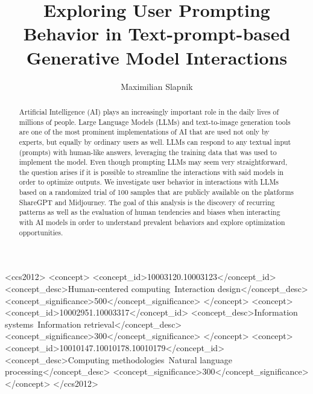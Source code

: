 \documentclass[sigconf]{acmart}
\begin{document}
\title[Prompting Behavior in Text-prompt-based Generative Model Interactions]{Exploring User
Prompting Behavior in Text-prompt-based Generative Model Interactions}

\author{Maximilian Slapnik}


\begin{abstract}
  \sloppy
  Artificial Intelligence (AI) plays an increasingly important role in the daily lives of
  millions of people.
  Large Language Models (LLMs) and text-to-image generation tools are one of the most prominent
  implementations of AI that are used
  not only by experts, but equally by ordinary users as well.
  LLMs can respond to any textual input (prompts) with human-like answers, leveraging the
  training data that was used to implement the model.
  Even though prompting LLMs may seem very straightforward, the question arises if it is possible
  to streamline the interactions with said models in order to optimize outputs.
  We investigate user behavior in interactions with LLMs based on a randomized trial of 100
  samples that are publicly available on the platforms ShareGPT and Midjourney.
  The goal of this analysis is the discovery of recurring patterns as well as the
  evaluation of human tendencies and biases when interacting with AI models in
  order to understand prevalent behaviors and explore optimization opportunities.
\end{abstract}



\begin{CCSXML}
  <ccs2012>
  <concept>
  <concept_id>10003120.10003123</concept_id>
  <concept_desc>Human-centered computing~Interaction design</concept_desc>
  <concept_significance>500</concept_significance>
  </concept>
  <concept>
  <concept_id>10002951.10003317</concept_id>
  <concept_desc>Information systems~Information retrieval</concept_desc>
  <concept_significance>300</concept_significance>
  </concept>
  <concept>
  <concept_id>10010147.10010178.10010179</concept_id>
  <concept_desc>Computing methodologies~Natural language processing</concept_desc>
  <concept_significance>300</concept_significance>
  </concept>
  </ccs2012>
\end{CCSXML}
\end{document}
